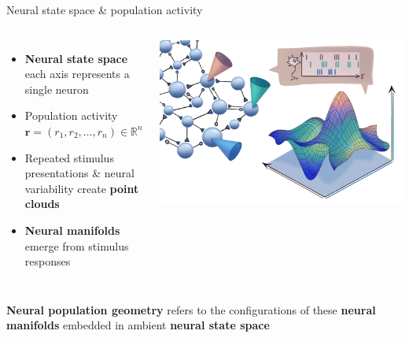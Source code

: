 \documentclass[aspectratio=169]{beamer}
\begin{document}
\begin{frame}{Neural state space \& population activity}
    \begin{columns}
        \begin{itemize}
            \item \textbf{Neural state space} each axis represents a single neuron
            \item Population activity $\mathbf{r} = (r_1, r_2, \ldots, r_n) \in \mathbb{R}^n$
            \item Repeated stimulus presentations \& neural variability create \textbf{point clouds}
            \item \textbf{Neural manifolds} emerge from stimulus responses
        \end{itemize}
        
        \begin{center}
            \includegraphics[width=\textwidth]{figs/manifold_schematic.png}
            \cite{Perich2024}
        \end{center}
    \end{columns}
\end{frame}

\begin{frame}{}
\textbf{Neural population geometry} refers to the configurations of these \textbf{neural manifolds} embedded in ambient \textbf{neural state space}~\cite{chung2021neural}
\end{frame}
\end{document}
